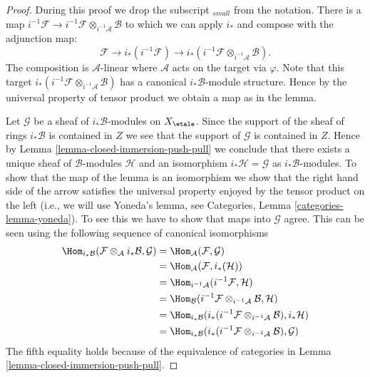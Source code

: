 \begin{proof}
During this proof we drop the subscript ${}_{small}$ from the notation.
There is a map
$i^{-1}\mathcal{F} \to
i^{-1}\mathcal{F} \otimes_{i^{-1}\mathcal{A}} \mathcal{B}$
to which we can apply $i_*$ and compose with the adjunction map:
$$
\mathcal{F} \longrightarrow
i_*(i^{-1}\mathcal{F}) \longrightarrow
i_*(i^{-1}\mathcal{F} \otimes_{i^{-1}\mathcal{A}} \mathcal{B}).
$$
The composition is $\mathcal{A}$-linear where $\mathcal{A}$ acts on the
target via $\varphi$. Note that this target
$i_*(i^{-1}\mathcal{F} \otimes_{i^{-1}\mathcal{A}} \mathcal{B})$
has a canonical $i_*\mathcal{B}$-module structure.
Hence by the universal property of tensor product we obtain
a map as in the lemma.

\medskip\noindent
Let $\mathcal{G}$ be a sheaf of $i_*\mathcal{B}$-modules on $X_\etale$.
Since the support of the sheaf of rings $i_*\mathcal{B}$ is contained in
$Z$ we see that the support of $\mathcal{G}$ is contained in $Z$.
Hence by
Lemma \ref{lemma-closed-immersion-push-pull}
we conclude that there exists a unique sheaf of $\mathcal{B}$-modules
$\mathcal{H}$ and an isomorphism $i_*\mathcal{H} = \mathcal{G}$
as $i_*\mathcal{B}$-modules.
To show that the map of the lemma is an isomorphism we show that the
right hand side of the arrow satisfies the universal property enjoyed
by the tensor product on the left (i.e., we will use
Yoneda's lemma, see
Categories, Lemma \ref{categories-lemma-yoneda}).
To see this we have to show that maps into $\mathcal{G}$ agree.
This can be seen using the following sequence of canonical isomorphisms
\begin{align*}
\Hom_{i_*\mathcal{B}}(
\mathcal{F} \otimes_\mathcal{A} i_*\mathcal{B},
\mathcal{G})
& =
\Hom_\mathcal{A}(
\mathcal{F},
\mathcal{G}) \\
& =
\Hom_\mathcal{A}(
\mathcal{F},
i_*(\mathcal{H})) \\
& =
\Hom_{i^{-1}\mathcal{A}}(
i^{-1}\mathcal{F},
\mathcal{H}) \\
& =
\Hom_\mathcal{B}(
i^{-1}\mathcal{F} \otimes_{i^{-1}\mathcal{A}} \mathcal{B},
\mathcal{H}) \\
& =
\Hom_{i_*\mathcal{B}}(
i_*(i^{-1}\mathcal{F} \otimes_{i^{-1}\mathcal{A}} \mathcal{B}),
i_*\mathcal{H}) \\
& =
\Hom_{i_*\mathcal{B}}(
i_*(i^{-1}\mathcal{F} \otimes_{i^{-1}\mathcal{A}} \mathcal{B}),
\mathcal{G})
\end{align*}
The fifth equality holds because of the equivalence of categories in
Lemma \ref{lemma-closed-immersion-push-pull}.
\end{proof}






